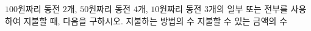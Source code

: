 $100$원짜리 동전 $2$개, $50$원짜리 동전 $4$개, $10$원짜리 동전 $3$개의 일부 또는 전부를 사용하여 지불할 때, 다음을 구하시오. 
 지불하는 방법의 수
 지불할 수 있는 금액의 수
